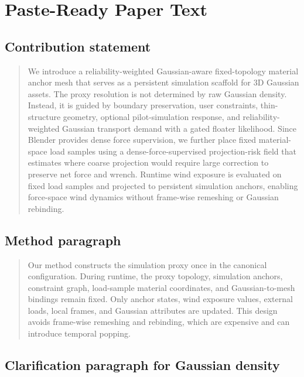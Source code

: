 \documentclass[11pt,a4paper]{article}
\begin{document}
\section{Paste-Ready Paper Text}

\subsection{Contribution statement}

\begin{quote}
We introduce a reliability-weighted Gaussian-aware fixed-topology material anchor mesh that serves as a persistent simulation scaffold for 3D Gaussian assets. The proxy resolution is not determined by raw Gaussian density. Instead, it is guided by boundary preservation, user constraints, thin-structure geometry, optional pilot-simulation response, and reliability-weighted Gaussian transport demand with a gated floater likelihood. Since Blender provides dense force supervision, we further place fixed material-space load samples using a dense-force-supervised projection-risk field that estimates where coarse projection would require large correction to preserve net force and wrench. Runtime wind exposure is evaluated on fixed load samples and projected to persistent simulation anchors, enabling force-space wind dynamics without frame-wise remeshing or Gaussian rebinding.
\end{quote}

\subsection{Method paragraph}

\begin{quote}
Our method constructs the simulation proxy once in the canonical configuration. During runtime, the proxy topology, simulation anchors, constraint graph, load-sample material coordinates, and Gaussian-to-mesh bindings remain fixed. Only anchor states, wind exposure values, external loads, local frames, and Gaussian attributes are updated. This design avoids frame-wise remeshing and rebinding, which are expensive and can introduce temporal popping.
\end{quote}

\subsection{Clarification paragraph for Gaussian density}
\end{document}
